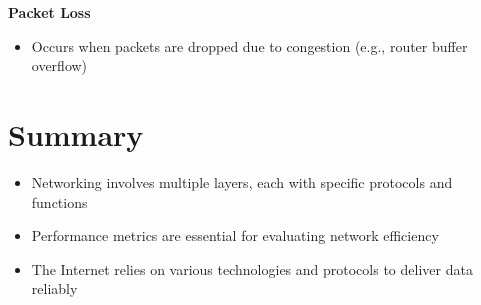 \documentclass[9pt]{extarticle}
\begin{document}
\begin{multicols*}{3}
\textbf{Packet Loss}
\begin{itemize}
    \item Occurs when packets are dropped due to congestion (e.g., router buffer overflow)
\end{itemize}

{\color{sectioncolor}\section*{\centering Summary}}
\begin{itemize}
    \item Networking involves multiple layers, each with specific protocols and functions
    \item Performance metrics are essential for evaluating network efficiency
    \item The Internet relies on various technologies and protocols to deliver data reliably
\end{itemize}

\end{multicols*}
\end{document}
